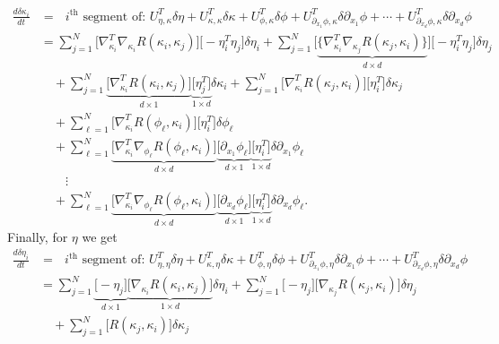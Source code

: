 \documentclass[noinfoline]{imsart}
\begin{document}
{\begin{align}
\frac{d\delta\kappa_i}{dt} &= \text{ $i^{\text{th}}$ segment of: }U_{\eta,\kappa}^T\delta\eta + U_{\kappa,\kappa}^T\delta\kappa + U_{\phi,\kappa}^T\delta\phi +  U_{\partial_{x_1} \phi,\kappa}^T\delta\partial_{x_1} \phi + \cdots  +  U_{\partial_{x_d} \phi,\kappa}^T\delta\partial_{x_d} \phi \\
&= \sum_{j=1}^N  \bigl[  \nabla^T_{\kappa_i}\nabla_{\kappa_i}R(\kappa_i,\kappa_j)  \bigr] \bigl[-\eta^T_i \eta_j\bigr] \delta\eta_i +\sum_{j=1}^N   \bigl[   \underbrace{ \{\nabla^T_{\kappa_i}\nabla_{\kappa_j}R(\kappa_j,\kappa_i)\} }_{d\times d}\bigr]{\bigl[-\eta^T_i \eta_j\bigr]}\delta\eta_j  \\
&\quad+\sum_{j=1}^N  \underbrace{\bigl[ \nabla^T_{\kappa_i} R(\kappa_i,\kappa_j)\bigr]}_{d\times 1} \underbrace{\bigl[\eta_j^T\bigr]}_{1\times d} \delta\kappa_i +\sum_{j=1}^N \bigl[ \nabla_{\kappa_i}^T R(\kappa_j,\kappa_i) \bigr]  \bigl[\eta_i^T\bigr] \delta\kappa_j \\
&\quad  + \sum_{\ell=1}^N \bigl[   \nabla^T_{\kappa_i}R(\phi_\ell,\kappa_i) \bigr] \bigl[\eta_i^T\bigr]\delta\phi_\ell \\
&\quad + \sum_{\ell=1}^N \underbrace{\bigl[\nabla_{\kappa_i}^T\nabla_{\phi_\ell}R(\phi_\ell,\kappa_i)\bigr]}_{d\times d}     \underbrace{\bigl[\partial_{x_1} {\phi_\ell}\bigr]}_{d\times 1}  \underbrace{\bigl[\eta_i^T\bigr]}_{1 \times d}  \delta\partial_{x_1}\phi_\ell  \\
 &\qquad\vdots \nonumber\\
&\quad + \sum_{\ell=1}^N \underbrace{\bigl[\nabla_{\kappa_i}^T\nabla_{\phi_\ell}R(\phi_\ell,\kappa_i)\bigr]}_{d\times d}     \underbrace{\bigl[\partial_{x_d} {\phi_\ell}\bigr]}_{d\times 1}  \underbrace{\bigl[\eta_i^T\bigr]}_{1 \times d}  \delta\partial_{x_d}\phi_\ell .
\end{align}
Finally, for $\eta$ we get
\begin{align}
\frac{d\delta\eta_i}{dt} &= \text{ $i^{\text{th}}$ segment of: }  U_{\eta,\eta}^T\delta\eta + U_{\kappa,\eta}^T\delta\kappa + U_{\phi,\eta}^T\delta\phi +  U_{\partial_{x_1} \phi,\eta}^T\delta\partial_{x_1} \phi + \cdots  +  U_{\partial_{x_d} \phi,\eta}^T\delta\partial_{x_d} \phi \\
&=   \sum_{j=1}^N  \underbrace{\bigl[-  \eta_j   \bigr]}_{d\times 1} \underbrace{ \bigl[ \nabla_{\kappa_i}R(\kappa_i,\kappa_j)\bigr]}_{1\times d} \delta\eta_i  + \sum_{j=1}^N  \bigl[- \eta_j     \bigr] \bigl[\nabla_{\kappa_j}R(\kappa_j,\kappa_i)\bigr] \delta\eta_j   \\
&\quad+\sum_{j=1}^N  \bigl[R(\kappa_j,\kappa_i)\bigr] \delta\kappa_j  \\

\end{align}}
\end{document}
